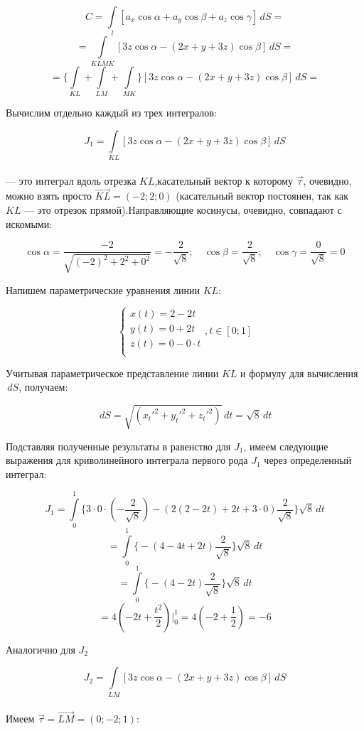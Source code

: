 \documentclass[12pt]{article}
\begin{document}
\begin{enumerate}[wide, labelwidth=!, labelindent=0pt]
		$$C = \int \limits_{l} [a_x\cos\alpha + a_y\cos\beta + a_z\cos\gamma]\,dS=$$
		$$ = \int \limits_{KLMK} [3z\cos\alpha -(2x + y + 3z)\cos\beta]\,dS=$$
		$$ = \bigg\{\int \limits_{KL}+\int \limits_{LM} + \int \limits_{MK}\bigg\} [3z\cos\alpha -(2x + y + 3z)\cos\beta]\,dS=$$
		
		Вычислим отдельно каждый из трех интегралов:
		
		$$J_1 = \int \limits_{KL} [3z\cos\alpha -(2x + y + 3z)\cos\beta]\,dS$$\\
		--- это интеграл вдоль отрезка $ KL $,касательный вектор к которому $ \vec{\tau} $, очевидно, можно взять просто $ \vec{KL} = (-2;2;0) $ (касательный вектор постоянен, так как $ KL $ --- это отрезок прямой).Направляющие косинусы, очевидно, совпадают с искомыми:
		
		$$\cos\alpha = \frac{-2}{\sqrt{(-2)^2+2^2 + 0^2}} = - \frac{2}{\sqrt{8}};\quad \cos\beta = \frac{2}{\sqrt{8}};\quad \cos\gamma = \frac{0}{\sqrt{8}} = 0$$
		
		Напишем параметрические уравнения линии $ KL $:
		
		$$\begin{cases}
			x(t) = 2 -2t\\
			y(t) = 0 + 2t\\
			z(t) = 0 -0\cdot t\\
		\end{cases}, t \in [0;1]$$
		
		Учитывая параметрическое представление линии $ KL $ и формулу для вычисления $ \,dS $, получаем: 
		
		$$\,dS = \sqrt{(x_t'^2 + y_t'^2 + z_t'^2 )} \,dt = \sqrt{8} \,dt$$  

		Подставляя полученные результаты в равенство для $ J_1 $, имеем следующие выражения для криволинейного интеграла первого рода $ J_1 $ через определенный интеграл:

		$$J_1 = \int \limits_{0}^1 \bigg\{ 3\cdot 0\cdot(- \frac{2}{\sqrt{8}}) -(2(2 -2t) + 2t + 3\cdot0)\frac{2}{\sqrt{8}} \bigg\}\sqrt{8} \,dt$$
		$$= \int \limits_{0}^1 \bigg\{  -(4 -4t + 2t)\frac{2}{\sqrt{8}} \bigg\}\sqrt{8} \,dt$$
		$$= \int \limits_{0}^1 \bigg\{  -(4 -2t)\frac{2}{\sqrt{8}} \bigg\}\sqrt{8} \,dt$$
		$$ = 4 (-2 t + \frac{t^2}{2})\Big|_0^{1} = 4 (-2 + \frac{1}{2}) = -6 $$

		Аналогично для $ J_2 $ 

		$$J_2 = \int \limits_{LM} [3z\cos\alpha -(2x + y + 3z)\cos\beta]\,dS$$\\
		Имеем $ \vec{\tau} = \vec{LM} = (0;-2;1) $:


\end{enumerate}
\end{document}
